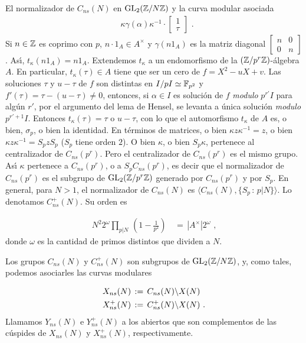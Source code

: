 \begin{subsection}{El normalizador de $C_{ns}(N)$ en $\mathrm{GL}_{2}(\mathbb{Z}/N\mathbb{Z})$ %
		y la curva modular asociada}
\begin{align*}
 & \kappa\gamma(\alpha)\kappa^{-1}\cdot\begin{bmatrix}1\\ \tau\end{bmatrix}
 \text{ .}
\end{align*}
Si $n\in\mathbb{Z}$ es coprimo con $p$, $n\cdot 1_{A}\in A^{\times}$ y
$\gamma(n1_{A})$ es la matriz diagonal
\begin{math}
\left[\begin{smallmatrix} n&0\\0&n\end{smallmatrix}\right]
\end{math}.
As\'{\i}, $t_{\kappa}(n1_{A})=n1_{A}$. Extendemos $t_{\kappa}$ a un endomorfismo
de la $(\mathbb{Z}/p^{r}\mathbb{Z})$-\'{a}lgebra $A$. En particular,
$t_{\kappa}(\tau)\in A$ tiene que ser un cero de $f=X^{2}-uX+v$. Las soluciones
$\tau$ y $u-\tau$ de $f$ son distintas en $I/pI\simeq\mathbb{F}_{p^{2}}$ y
$f'(\tau)=\tau-(u-\tau)\not =0$, entonces,
si $\alpha\in I$ es soluci\'{o}n de $f$ \textit{modulo} $p^{r'}I$ para alg\'{u}n
$r'$, por el argumento del lema de Hensel, se levanta a \'{u}nica soluci\'{o}n
\textit{modulo} $p^{r'+1}I$. Entonces $t_{\kappa}(\tau)=\tau$ o $u-\tau$, con lo
que el automorfismo $t_{\kappa}$ de $A$ es, o bien, $\sigma_{p}$, o bien la
identidad. En t\'{e}rminos de matrices, o bien $\kappa z\kappa^{-1}=z$, o bien
$\kappa z\kappa^{-1}=S_{p}zS_{p}$ ($S_{p}$ tiene orden $2$). O bien $\kappa$,
o bien $S_{p}\kappa$, pertenece al centralizador de $C_{ns}(p^{r})$. Pero el
centralizador de $C_{ns}(p^{r})$ es el mismo grupo. As\'{\i}
$\kappa$ pertenece a $C_{ns}(p^{r})$, o a $S_{p}C_{ns}(p^{r})$, es decir que el
normalizador de $C_{ns}(p^{r})$ es el subgrupo de $\mathrm{GL}_{2}(\mathbb{Z}/p^{r}\mathbb{Z})$
generado por $C_{ns}(p^{r})$ y por $S_{p}$. En general, para $N>1$,
el normalizador de $C_{ns}(N)$ es $\langle C_{ns}(N),\{S_{p}\,:\,p|N\} \rangle$.
Lo denotamos $C_{ns}^{+}(N)$. Su orden es

\begin{align*}
N^{2}2^{\omega}\prod_{p|N}\,\left(1-\frac{1}{p^{2}}\right) &
\,=\,|A^{\times}|2^{\omega}\text{ ,}
\end{align*}
donde $\omega$ es la cantidad de primos distintos que dividen a $N$.

Los grupos $C_{ns}(N)$ y $C_{ns}^{+}(N)$ son subgrupos de $\mathrm{GL}_{2}(\mathbb{Z}/N\mathbb{Z})$,
y, como tales, podemos asociarles las curvas modulares

\begin{align*}
 X_{ns}(N) & \,:=\,C_{ns}(N)\backslash X(N)\\
 X_{ns}^{+}(N) &\,:=\,C_{ns}^{+}(N)\backslash X(N)\text{ .}
\end{align*}
Llamamos $Y_{ns}(N)$ e $Y_{ns}^{+}(N)$ a los abiertos que son complementos de las
c\'{u}spides de $X_{ns}(N)$ y $X_{ns}^{+}(N)$, respectivamente.


\end{subsection}
